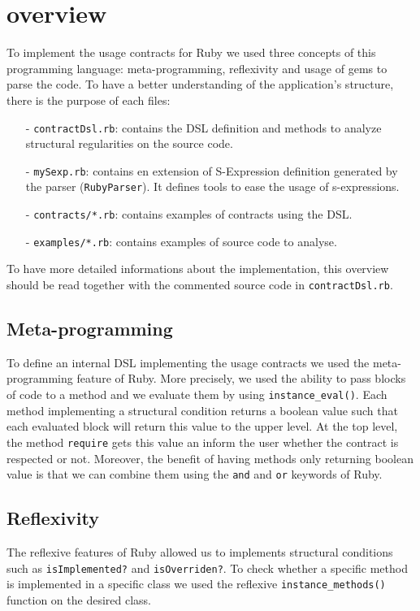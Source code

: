 \section{overview}
To implement the usage contracts for Ruby we used three concepts of this programming language: meta-programming, reflexivity and usage of gems to parse the code.
To have a better understanding of the application's structure, there is the purpose of each files:
\begin{enumerate}
	\item[-] \verb+contractDsl.rb+: contains the DSL definition and methods to analyze structural regularities on the source code. 
	\item[-] \verb+mySexp.rb+: contains en extension of S-Expression definition generated by the parser (\verb+RubyParser+). It defines tools to ease the usage of s-expressions.
	\item[-] \verb+contracts/*.rb+: contains examples of contracts using the DSL.
	\item[-] \verb+examples/*.rb+: contains examples of source code to analyse.
	\end{enumerate}
To have more detailed informations about the implementation, this overview should be read together with the commented source code in \verb+contractDsl.rb+.
\subsection{Meta-programming}
To define an internal DSL implementing the usage contracts we used the meta-programming feature of Ruby. More precisely, we used the ability to pass blocks of code to a method and we evaluate them by using \verb+instance_eval()+. Each method implementing a structural condition returns a boolean value such that each evaluated block will return this value to the upper level. At the top level, the method \verb+require+ gets this value an inform the user whether the contract is respected or not. Moreover, the benefit of having methods only returning boolean value is that we can combine them using the \verb+and+ and \verb+or+ keywords of Ruby.



\subsection{Reflexivity}
The reflexive features of Ruby allowed us to implements structural conditions such as \verb+isImplemented?+ and \verb+isOverriden?+. To check whether a specific method is implemented in a specific class we used the reflexive \verb+instance_methods()+ function on the desired class.


